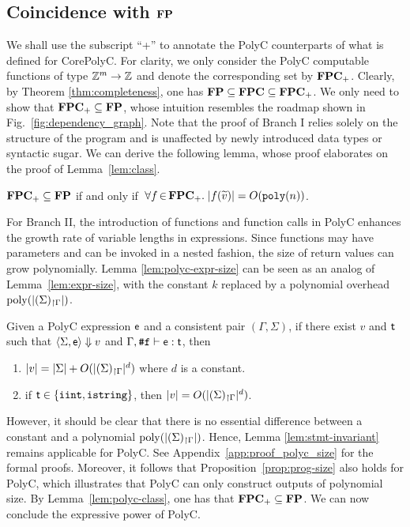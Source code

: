 \documentclass[runningheads]{llncs}
\begin{document}
\subsection{Coincidence with $\classFP$}

We shall use the subscript ``+'' to annotate the PolyC counterparts of what is defined for CorePolyC.
For clarity, we only consider the PolyC computable functions of type $\Z^m \to \Z$ and denote the corresponding set by $\classPC_{+}$.
Clearly, by Theorem \ref{thm:completeness}, one has $\classFP \subseteq \classPC \subseteq \classPC_{+}$.
We only need to show that $\classPC_{+}\subseteq\classFP$, whose intuition resembles the roadmap shown in Fig.~\ref{fig:dependency_graph}.
Note that the proof of Branch I relies solely on the structure of the program and is unaffected by newly introduced data types or syntactic sugar.
We can derive the following lemma, whose proof elaborates on the proof of Lemma~\ref{lem:class}.

\begin{lemma}\label{lem:polyc-class}
$\classPC_{+}\subseteq \classFP$ if and only if $\,\forall f\,{\in}\,\classPC_{+}.\;|f(\widetilde{v})| =O(\polyn)$.
\end{lemma}

For Branch II, the introduction of functions and function calls in PolyC enhances the growth rate of variable lengths in expressions.
Since functions may have parameters and can be invoked in a nested fashion, the size of return values can grow polynomially.
Lemma \ref{lem:polyc-expr-size} can be seen as an analog of Lemma~\ref{lem:expr-size}, with the constant $k$ replaced by a polynomial overhead $\mathrm{poly}(\size{\restr{\Sigma}{\Gamma}})$.
\begin{lemma}
\label{lem:polyc-expr-size}
Given a PolyC expression $\e$ and a consistent pair $(\Gamma,\Sigma)$, if there exist $v$ and $\tt$ such that $\semantics{\Sigma}{\e}{v}$ and $\typing{\Gamma}{\f}{\e}{\tt}$, then
\begin{enumerate}
    \item $\size{v}=\size{\Sigma}+O(\size{\restr{\Sigma}{\Gamma}}^{d})$ where $d$ is a constant.
    \item if $\tt\in\{\typeIterInt, \mathtt{{istring}}\}$, then $\size{v}=O(\size{\restr{\Sigma}{\Gamma}}^{d})$.
\end{enumerate}
\end{lemma}

However, it should be clear that there is no essential difference between a constant and a polynomial $\mathrm{poly}(\size{\restr{\Sigma}{\Gamma}})$.
Hence, Lemma \ref{lem:stmt-invariant} remains applicable for PolyC.
See Appendix~\ref{app:proof_polyc_size} for the formal proofs.
Moreover, it follows that Proposition~\ref{prop:prog-size} also holds for PolyC, which illustrates that PolyC can only construct outputs of polynomial size. 
By Lemma~\ref{lem:polyc-class}, one has that $\classPC_{+} \subseteq \classFP$.
We can now conclude the expressive power of PolyC.
\end{document}
